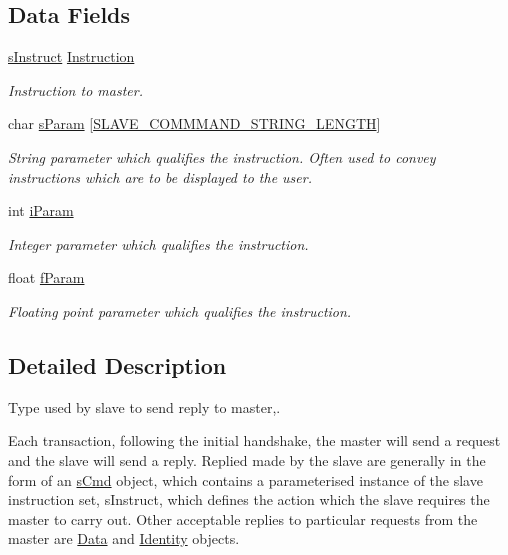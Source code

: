 \subsection*{Data Fields}
\begin{DoxyCompactItemize}
\item 
\mbox{\hyperlink{_s_p_i___instruction_set_8h_a949ec019a0f52780dcdd7d5a5ba73e47}{s\+Instruct}} \mbox{\hyperlink{structs_cmd_ae44f8e2a61a9d80037ef1379815d51cc}{Instruction}}
\begin{DoxyCompactList}\small\item\em Instruction to master. \end{DoxyCompactList}\item 
char \mbox{\hyperlink{structs_cmd_ae61e22459fa014bbc635b6280b5a5e1f}{s\+Param}} \mbox{[}\mbox{\hyperlink{_s_p_i___instruction_set_8h_afb2f23f8980c03317ec47ce151335ec7}{S\+L\+A\+V\+E\+\_\+\+C\+O\+M\+M\+M\+A\+N\+D\+\_\+\+S\+T\+R\+I\+N\+G\+\_\+\+L\+E\+N\+G\+TH}}\mbox{]}
\begin{DoxyCompactList}\small\item\em String parameter which qualifies the instruction. Often used to convey instructions which are to be displayed to the user. \end{DoxyCompactList}\item 
int \mbox{\hyperlink{structs_cmd_a4d0a4aab326d0ba8eb8128adb61c0888}{i\+Param}}
\begin{DoxyCompactList}\small\item\em Integer parameter which qualifies the instruction. \end{DoxyCompactList}\item 
float \mbox{\hyperlink{structs_cmd_af05b89ac7edf2c67bb3386c902369313}{f\+Param}}
\begin{DoxyCompactList}\small\item\em Floating point parameter which qualifies the instruction. \end{DoxyCompactList}\end{DoxyCompactItemize}


\subsection{Detailed Description}
Type used by slave to send reply to master,. 

Each transaction, following the initial handshake, the master will send a request and the slave will send a reply. Replied made by the slave are generally in the form of an \mbox{\hyperlink{structs_cmd}{s\+Cmd}} object, which contains a parameterised instance of the slave instruction set, s\+Instruct, which defines the action which the slave requires the master to carry out. Other acceptable replies to particular requests from the master are \mbox{\hyperlink{struct_data}{Data}} and \mbox{\hyperlink{struct_identity}{Identity}} objects. 

